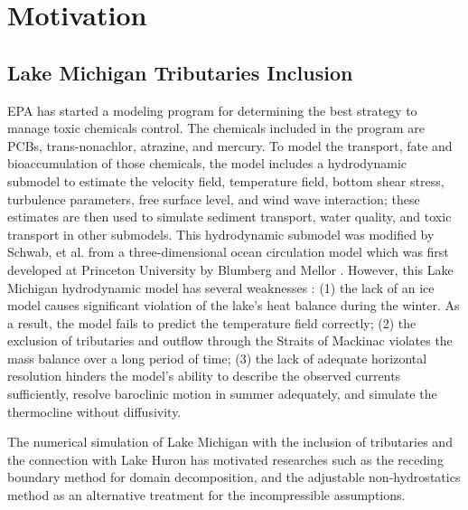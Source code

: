 \section{Motivation}

\normalsize
\subsection{Lake Michigan Tributaries Inclusion}

EPA has started a modeling program for determining the best strategy to manage toxic chemicals control. The chemicals included in the program are PCBs, trans-nonachlor, atrazine, and mercury. To model the transport, fate and bioaccumulation of those chemicals, the model includes a hydrodynamic submodel to estimate the velocity field, temperature field, bottom shear stress, turbulence parameters, free surface level, and wind wave interaction; these estimates are then used to simulate sediment transport, water quality, and toxic transport in other submodels. This hydrodynamic submodel was modified by Schwab, et al. \cite{SCHWAB1994, SCHWAB1998} from a three-dimensional ocean circulation model which was first developed at Princeton University by Blumberg and Mellor \cite{Blumberg1987}. However, this Lake Michigan hydrodynamic model has several weaknesses \cite{SCHWAB1998}: (1) the lack of an ice model causes significant violation of the lake's heat balance during the winter. As a result, the model fails to predict the temperature field correctly; (2) the exclusion of tributaries and outflow through the Straits of Mackinac violates the mass balance over a long period of time; (3) the lack of adequate horizontal resolution hinders the model's ability to describe the observed currents sufficiently, resolve baroclinic motion in summer adequately, and simulate the thermocline without diffusivity.

The numerical simulation of Lake Michigan with the inclusion of tributaries and the connection with Lake Huron has motivated researches such as the receding boundary method for domain decomposition, and the adjustable non-hydrostatics method as an alternative treatment for the incompressible assumptions.

